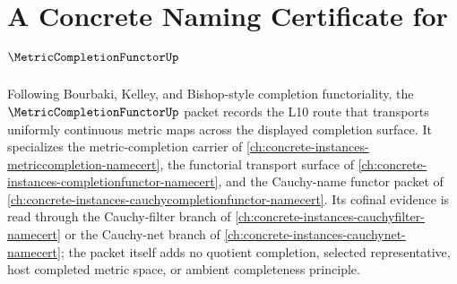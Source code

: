 \chapter{A Concrete Naming Certificate for $\MetricCompletionFunctorUp$}
\label{ch:concrete-instances-metric-completion-functor-namecert}

Following Bourbaki, Kelley, and Bishop-style completion functoriality, the $\MetricCompletionFunctorUp$ packet records the L10 route that transports uniformly continuous metric maps across the displayed completion surface. It specializes the metric-completion carrier of \autoref{ch:concrete-instances-metriccompletion-namecert}, the functorial transport surface of \autoref{ch:concrete-instances-completionfunctor-namecert}, and the Cauchy-name functor packet of \autoref{ch:concrete-instances-cauchycompletionfunctor-namecert}. Its cofinal evidence is read through the Cauchy-filter branch of \autoref{ch:concrete-instances-cauchyfilter-namecert} or the Cauchy-net branch of \autoref{ch:concrete-instances-cauchynet-namecert}; the packet itself adds no quotient completion, selected representative, host completed metric space, or ambient completeness principle.

